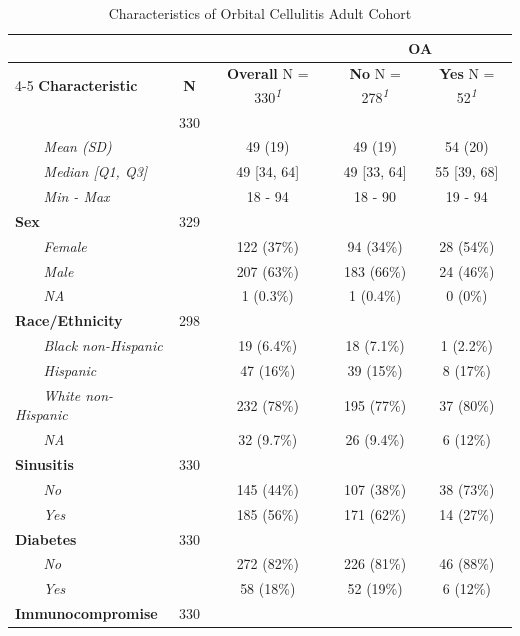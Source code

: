 \documentclass[
]{article}
\begin{document}
\begin{table}[t]
\caption*{
{\fontsize{20}{25}\selectfont  Characteristics of Orbital Cellulitis Adult Cohort\small }
} 
\begin{tabular*}{0.7\linewidth}{@{\extracolsep{\fill}}lcccc}
\toprule
 &  &  & \multicolumn{2}{c}{\textbf{OA}} \\ 
\cmidrule(lr){4-5}
\textbf{Characteristic} & \textbf{N} & \textbf{Overall}  N = 330\textsuperscript{\textit{1}} & \textbf{No}  N = 278\textsuperscript{\textit{1}} & \textbf{Yes}  N = 52\textsuperscript{\textit{1}} \\ 
\midrule\addlinespace[2.5pt]
{\bfseries Age} & 330 &  &  &  \\ 
{\itshape     Mean (SD)} &  & 49 (19) & 49 (19) & 54 (20) \\ 
{\itshape     Median {[}Q1, Q3{]}} &  & 49 {[}34, 64{]} & 49 {[}33, 64{]} & 55 {[}39, 68{]} \\ 
{\itshape     Min - Max} &  & 18 - 94 & 18 - 90 & 19 - 94 \\ 
{\bfseries Sex} & 329 &  &  &  \\ 
{\itshape     Female} &  & 122 (37\%) & 94 (34\%) & 28 (54\%) \\ 
{\itshape     Male} &  & 207 (63\%) & 183 (66\%) & 24 (46\%) \\ 
{\itshape     NA} &  & 1 (0.3\%) & 1 (0.4\%) & 0 (0\%) \\ 
{\bfseries Race/Ethnicity} & 298 &  &  &  \\ 
{\itshape     Black non-Hispanic} &  & 19 (6.4\%) & 18 (7.1\%) & 1 (2.2\%) \\ 
{\itshape     Hispanic} &  & 47 (16\%) & 39 (15\%) & 8 (17\%) \\ 
{\itshape     White non-Hispanic} &  & 232 (78\%) & 195 (77\%) & 37 (80\%) \\ 
{\itshape     NA} &  & 32 (9.7\%) & 26 (9.4\%) & 6 (12\%) \\ 
{\bfseries Sinusitis} & 330 &  &  &  \\ 
{\itshape     No} &  & 145 (44\%) & 107 (38\%) & 38 (73\%) \\ 
{\itshape     Yes} &  & 185 (56\%) & 171 (62\%) & 14 (27\%) \\ 
{\bfseries Diabetes} & 330 &  &  &  \\ 
{\itshape     No} &  & 272 (82\%) & 226 (81\%) & 46 (88\%) \\ 
{\itshape     Yes} &  & 58 (18\%) & 52 (19\%) & 6 (12\%) \\ 
{\bfseries Immunocompromise} & 330 &  &  &  \\ 

\end{tabular*}
\end{table}
\end{document}
